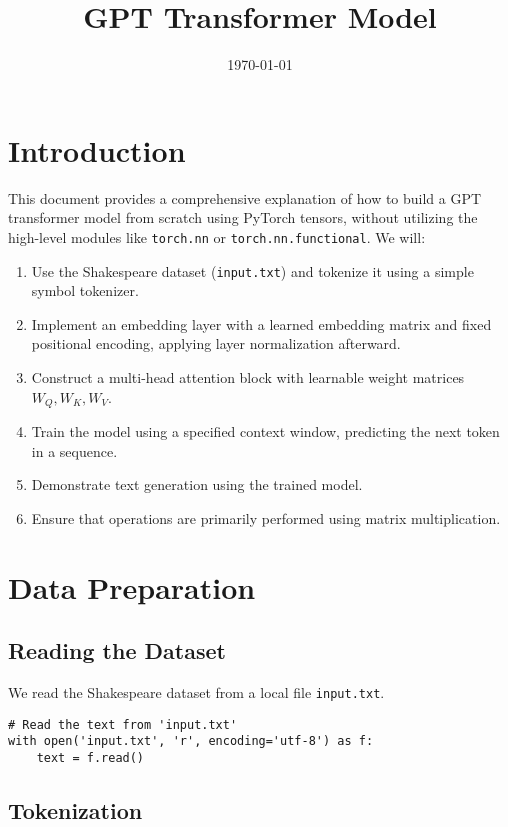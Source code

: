 \documentclass{article}
\title{GPT Transformer Model}
\date{\today}
\begin{document}
\maketitle

\newpage
\section{Introduction}

This document provides a comprehensive explanation of how to build a GPT transformer model from scratch using PyTorch tensors, without utilizing the high-level modules like \texttt{torch.nn} or \texttt{torch.nn.functional}. We will:

\begin{enumerate}
    \item Use the Shakespeare dataset (\texttt{input.txt}) and tokenize it using a simple symbol tokenizer.
    \item Implement an embedding layer with a learned embedding matrix and fixed positional encoding, applying layer normalization afterward.
    \item Construct a multi-head attention block with learnable weight matrices \( W_Q, W_K, W_V \).
    \item Train the model using a specified context window, predicting the next token in a sequence.
    \item Demonstrate text generation using the trained model.
    \item Ensure that operations are primarily performed using matrix multiplication.
\end{enumerate}

\section{Data Preparation}

\subsection{Reading the Dataset}

We read the Shakespeare dataset from a local file \texttt{input.txt}.

\begin{lstlisting}[style=pythonstyle]
# Read the text from 'input.txt'
with open('input.txt', 'r', encoding='utf-8') as f:
    text = f.read()
\end{lstlisting}

\subsection{Tokenization}
\end{document}
